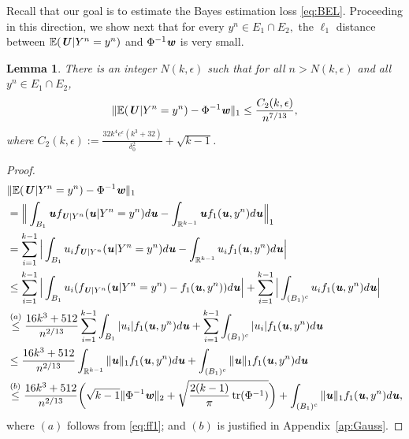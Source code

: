 \documentclass[11pt,onecolumn]{IEEEtran}
\newtheorem{lemma}[theorem]{Lemma}
\def\mathbi#1{{\textbf{\textit #1}}}
\DeclareMathOperator{\tr}{tr}
\begin{document}
\vspace*{.1in}
Recall that our goal is to estimate the Bayes estimation loss \eqref{eq:BEL}. Proceeding in this direction, we show next that for every $y^n \in E_1\cap E_2,$ the $\ell_1$ distance between $\mathbb{E}(\mathbi{U}|Y^n=y^n)$ and $\Phi^{-1}\mathbi{w}$ is very small.
\begin{lemma}\label{lemma:EPhi}
 There is an integer $N(k,\epsilon)$ such that for all $n>N(k,\epsilon)$ and all
$y^n \in E_1\cap E_2$,
  $$
  \|\mathbb{E}(\mathbi{U}|Y^n=y^n)-\Phi^{-1}\mathbi{w}\|_1\le \frac{C_2(k,\epsilon)}{n^{7/13}},
  $$
  where $C_2(k,\epsilon) := \frac{32k^4 e^{\epsilon}(k^3+32)}{\delta_0^2}
+ \sqrt{k-1}$.
\end{lemma}

\begin{proof}
  \begin{align}
&  \| \mathbb{E}(\mathbi{U}|Y^n=y^n) - \Phi^{-1}\mathbi{w} \|_1 \nonumber\\
&=  \Big\| \int_{ B_1} \mathbi{u} f_{\mathbi{U}|Y^n}(\mathbi{u}|Y^n=y^n) d\mathbi{u}
- \int_{\mathbb{R}^{k-1}} \mathbi{u} f_1(\mathbi{u},y^n) d\mathbi{u} \Big\|_1 \nonumber\\
&=  \sum_{i=1}^{k-1} \Big| \int_{ B_1} u_i f_{\mathbi{U}|Y^n}(\mathbi{u}|Y^n=y^n) d\mathbi{u}
- \int_{ \mathbb{R}^{k-1}} u_i f_1(\mathbi{u},y^n) d\mathbi{u} \Big| \nonumber\\
&\le  \sum_{i=1}^{k-1} \Big|\int_{ B_1} u_i (f_{\mathbi{U}|Y^n}(\mathbi{u}|Y^n=y^n) - f_1(\mathbi{u},y^n)) d\mathbi{u} \Big|
+ \sum_{i=1}^{k-1} \Big| \int_{ (B_1)^c} u_i f_1(\mathbi{u},y^n) d\mathbi{u} \Big| \nonumber\\
&\overset{(a)}{\le} \frac{16k^3 + 512}{n^{2/13} } \sum_{i=1}^{k-1} \int_{ B_1} |u_i| f_1(\mathbi{u},y^n) d\mathbi{u}
+ \sum_{i=1}^{k-1} \int_{ (B_1)^c} |u_i| f_1(\mathbi{u},y^n) d\mathbi{u}  \nonumber\\
& \le  \frac{16k^3 + 512}{n^{2/13} }  \int_{ \mathbb{R}^{k-1}} 
\|\mathbi{u} \|_1 f_1(\mathbi{u},y^n) d\mathbi{u}
+  \int_{ (B_1)^c} \|\mathbi{u}\|_1 f_1(\mathbi{u},y^n) d\mathbi{u} \nonumber\\
&\overset{(b)}{\le}  \frac{16k^3 + 512}{n^{2/13} } \biggl( \sqrt{k-1} \| \Phi^{-1}\mathbi{w} \|_2 + \sqrt{\frac{2(k-1)}{\pi} \tr(\Phi^{-1})} \biggr)
+  \int_{ (B_1)^c} \|\mathbi{u}\|_1 f_1(\mathbi{u},y^n) d\mathbi{u}, \label{eq:bdE}
  \end{align}
where $(a)$ follows from \eqref{eq:ff1}; and $(b)$ is justified in Appendix~\ref{ap:Gauss}.


\end{proof}
\end{document}
